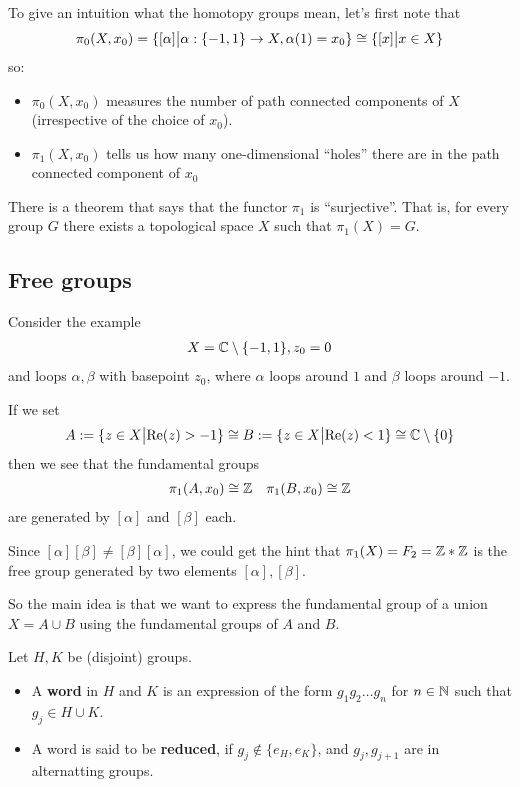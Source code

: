 To give an intuition what the homotopy groups mean, let's first note that
\begin{align*}
  \pi_0(X,x_0) = \{[\alpha] \big\vert \alpha: \{-1,1\} \to  X, \alpha(1) = x_0\} \cong \{[x] \big\vert x \in X\}
\end{align*}
so:
\begin{itemize}
  \item $\pi_0(X,x_0)$ measures the number of path connected components of $X$ (irrespective of the choice of $x_0$).
  \item $\pi_1(X,x_0)$ tells us how many one-dimensional ``holes'' there are in the path connected component of $x_0$
\end{itemize}

\begin{rem}[]
  There is a theorem that says that the functor $\pi_1$ is ``surjective''. 
  That is, for every group $G$ there exists a topological space $X$ such that $\pi_1(X) = G$.
\end{rem}

\subsection{Free groups}
Consider the example
\begin{align*}
  X = \mathbb{C} \setminus \{-1,1\}, z_0 = 0
\end{align*}
and loops $\alpha,\beta$ with basepoint $z_0$, where $\alpha$ loops around $1$ and $\beta$ loops around $-1$.

If we set
\begin{align*}
  A := \{z \in X \big\vert \text{Re}(z) > -1\} \cong B:= \{z \in X \big\vert \text{Re}(z) < 1\} \cong \mathbb{C} \setminus \{0\}
\end{align*}
then we see that the fundamental groups 
\begin{align*}
  \pi_1(A,x_0) \cong \mathbb{Z} \quad \pi_1(B,x_0) \cong \mathbb{Z}
\end{align*}
are generated by $[\alpha]$ and $[\beta]$ each.

Since $[\alpha] [\beta] \neq [\beta] [\alpha]$, we could get the hint that $\pi_1(X) = F_2 = \mathbb{Z} \ast \mathbb{Z}$ is the free group generated by two elements $[\alpha],[\beta]$.

So the main idea is that we want to express the fundamental group of a union $X = A \cup B$ using the fundamental groups of $A$ and $B$.

\begin{dfn}[]
  Let $H,K$ be (disjoint) groups. 
  \begin{itemize}
    \item A \textbf{word} in $H$ and $K$ is an expression of the form $g_1g_2 \dots g_n$ for $n \in \mathbb{N}$ such that $g_j \in H \cup K$.
    \item A word is said to be \textbf{reduced}, if $g_j \notin \{e_H,e_K\}$, and $g_j,g_{j+1}$ are in alternatting groups.
  \end{itemize}
\end{dfn}

